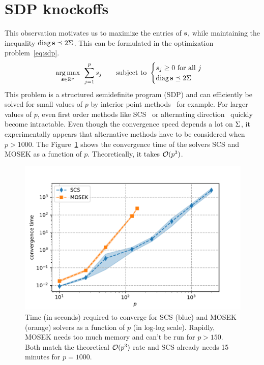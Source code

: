 \section{SDP knockoffs}\label{sec:sdp}

This observation motivates us to maximize the entries of $\mathbf{s}$,
while maintaining the inequality $\operatorname*{diag}\mathbf{s} \preceq 2\Sigma$.
This can be formulated in the optimization problem~\ref{eq:sdp}.
\begin{equation}\label{eq:sdp}
    \underset{\mathbf{s} \in \mathbb{R}^p}{\operatorname*{arg\,max}}\;\,
    \sum_{j = 1}^p s_j
    \qquad
    \text{subject to } \begin{cases}
        s_j \geq 0\text{ for all } j\\
        \operatorname*{diag} \mathbf{s} \preceq 2\Sigma
    \end{cases}
\end{equation}
This problem is a structured semidefinite program (SDP) and can efficiently be solved for small values of
$p$ by interior point methods~\cite{interior_point_method_sdp} for example.
For larger values of $p$, even first order methods like
SCS~\cite{sdp_scs} or alternating direction~\cite{sdp_admm}
quickly become intractable.
Even though the convergence speed depends a lot on $\Sigma$,
it experimentally appears that alternative methods have to be considered when $p > 1000$.
The Figure~\ref{fig:cvx_sdp_times} shows the convergence time of the solvers SCS and MOSEK as a function of $p$.
Theoretically, it takes $\mathcal{O}(p^3)$.

\begin{figure}
    \centering
    \includegraphics[width=0.8\linewidth, height=0.5\linewidth]{figures/cvx_sdp_times.pdf}
    \caption{
        Time (in seconds) required to converge for SCS (blue) and MOSEK (orange) solvers
        as a function of $p$ (in log-log scale).
        Rapidly, MOSEK needs too much memory and can't be run for $p > 150$.
        Both match the theoretical $\mathcal{O}(p^3)$ rate and SCS already needs 15 minutes for $p = 1000$.
    }
    \label{fig:cvx_sdp_times}
\end{figure}

